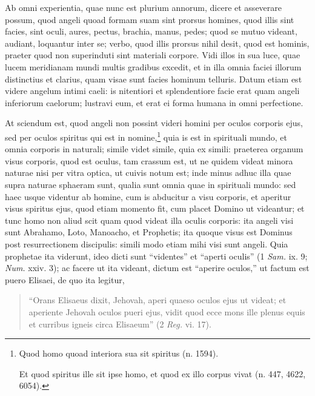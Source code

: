 \begin{topic}{75}
    Ab omni experientia, quae nunc est plurium annorum, dicere et asseverare possum, quod angeli quoad formam suam sint
    prorsus homines, quod illis sint facies, sint oculi, aures, pectus, brachia, manus, pedes; quod se mutuo videant,
    audiant, loquantur inter se; verbo, quod illis prorsus nihil desit, quod est hominis, praeter quod non superinduti
    sint materiali corpore.
    Vidi illos in sua luce, quae lucem meridianam mundi multis gradibus excedit, et in illa omnia faciei illorum
    distinctius et clarius, quam visae sunt facies hominum telluris.
    Datum etiam est videre angelum intimi caeli: is nitentiori et splendentiore facie erat quam angeli inferiorum
    caelorum; lustravi eum, et erat ei forma humana in omni perfectione.
\end{topic}

\begin{topic}{76}
    At sciendum est, quod angeli non possint videri homini per oculos corporis ejus, sed per oculos spiritus qui est in
    nomine,\footnote{Quod homo quoad interiora sua sit spiritus (n. 1594).

    Et quod spiritus ille sit ipse homo, et quod ex illo corpus vivat (n. 447, 4622, 6054).} quia is est in spirituali
    mundo, et omnia corporis in naturali; simile videt simile, quia ex simili: praeterea organum visus corporis, quod
    est oculus, tam crassum est, ut ne quidem videat minora naturae nisi per vitra optica, ut cuivis notum est; inde
    minus adhuc illa quae supra naturae sphaeram sunt, qualia sunt omnia quae in spirituali mundo: sed haec usque
    videntur ab homine, cum is abducitur a visu corporis, et aperitur visus spiritus ejus, quod etiam momento fit, cum
    placet Domino ut videantur; et tunc homo non aliud scit quam quod videat illa oculis corporis: ita angeli visi sunt
    Abrahamo, Loto, Manoacho, et Prophetis; ita quoque visus est Dominus post resurrectionem discipulis: simili modo
    etiam mihi visi sunt angeli.
    Quia prophetae ita viderunt, ideo dicti sunt ``videntes'' et ``aperti oculis'' (1 \emph{Sam.} ix. 9; \emph{Num.}
    xxiv. 3); ac facere ut ita videant, dictum est ``aperire oculos,'' ut factum est puero Elisaei, de quo ita legitur,
    \begin{quote}
        ``Orans Elisaeus dixit, Jehovah, aperi quaeso oculos ejus ut videat; et aperiente Jehovah oculos pueri ejus,
        vidit quod ecce mons ille plenus equis et curribus igneis circa Elisaeum'' (2 \emph{Reg.} vi. 17).
    \end{quote}
\end{topic}

